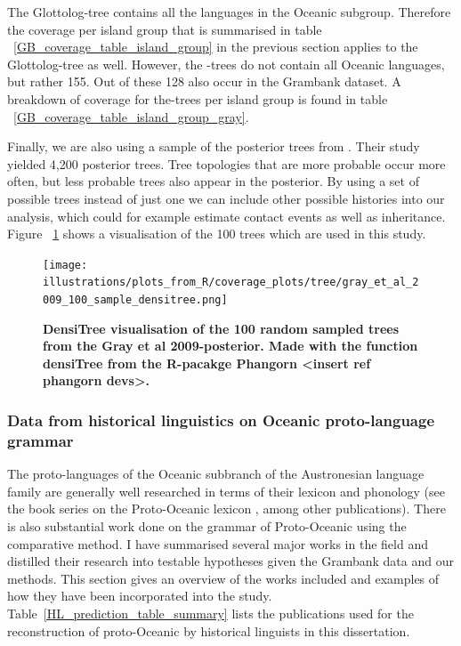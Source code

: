 \documentclass[draft,10pt]{article} %
\begin{document}
The Glottolog-tree contains all the languages in the Oceanic subgroup. Therefore the coverage per island group that is summarised in table ~\ref{GB_coverage_table_island_group} in the previous section applies to the Glottolog-tree as well. However, the \cite{grayetal_2009}-trees do not contain all Oceanic languages, but rather 155. Out of these 128 also occur in the Grambank dataset. A breakdown of coverage for the\cite{grayetal_2009}-trees per island group is found in table ~\ref{GB_coverage_table_island_group_gray}.

Finally, we are also using a sample of the posterior trees from \cite{grayetal_2009}. Their study yielded 4,200 posterior trees. Tree topologies that are more probable occur more often, but less probable trees also appear in the posterior. By using a set of possible trees instead of just one we can include other possible histories into our analysis, which could for example estimate contact events as well as inheritance. Figure ~\ref{densitree_plot} shows a visualisation of the 100 trees which are used in this study.

\begin{figure}[H]
\centering
\texttt{[image: illustrations/plots\_from\_R/coverage\_plots/tree/gray\_et\_al\_2009\_100\_sample\_densitree.png]}
\caption{\textbf{DensiTree \citep{bouckaert2014densitree} visualisation of the 100 random sampled trees from the Gray et al 2009-posterior. Made with the function densiTree from the R-pacakge Phangorn <insert ref phangorn devs>.}}
\label{densitree_plot}
\end{figure}

\subsubsection{Data from historical linguistics on Oceanic proto-language grammar}
\label{sec:POC_lit_review}

The proto-languages of the Oceanic subbranch of the Austronesian language family are generally well researched in terms of their lexicon and phonology (see the book series on the Proto-Oceanic lexicon \citep{protooceanicvol1, protooceanicvol2, protooceanicvol3, protooceanicvol4, protooceanicvol5}, among other publications). There is also substantial work done on the grammar of Proto-Oceanic using the comparative method. I have summarised several major works in the field and distilled their research into testable hypotheses given the Grambank data and our methods. This section gives an overview of the works included and examples of how they have been incorporated into the study. Table~\ref{HL_prediction_table_summary} lists the publications used for the reconstruction of proto-Oceanic by historical linguists in this dissertation. 
\end{document}
